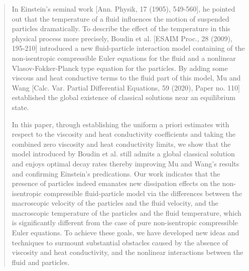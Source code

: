 \documentclass[reqno,11pt]{amsart}
\theoremstyle{plain}
\numberwithin{equation}{section}
\begin{document}
\begin{abstract}

In Einstein's seminal work [Ann. Physik, 17 (1905), 549-560], he pointed out that the temperature of a fluid influences the motion of suspended particles dramatically. To describe the effect of the temperature in this physical process more precisely, Boudin et al. [ESAIM Proc., 28 (2009), 195-210] introduced a new fluid-particle interaction model containing of the non-isentropic compressible Euler equations for the fluid and a nonlinear Vlasov-Fokker-Planck type equation for the particles. By adding some viscous and heat conductive terms to the fluid part of this model, Mu and Wang [Calc. Var. Partial Differential Equations, 59 (2020), Paper no. 110] established the global existence of classical solutions near an equilibrium state.
  
 In this paper, through establishing the uniform a priori estimates with respect to the viscosity and heat conductivity coefficients and taking the combined zero viscosity and heat conductivity limits, we show that the model introduced by Boudin et al. still admits a global classical solution and enjoys optimal decay rates thereby improving Mu and Wang's results and confirming Einstein's predications. Our work indicates that the presence of particles indeed emanates new dissipation effects on the non-isentropic compressible fluid-particle model via the differences between the macroscopic velocity of the particles and the fluid velocity, and the macroscopic temperature of the particles and the fluid temperature, which is significantly different from the case of pure non-isentropic compressible Euler equations. To achieve these goals, we have developed new ideas and techniques to surmount substantial obstacles caused by the absence of viscosity and heat conductivity, and the nonlinear interactions between the fluid and particles. 
   
%
% 


\end{abstract}
\end{document}
